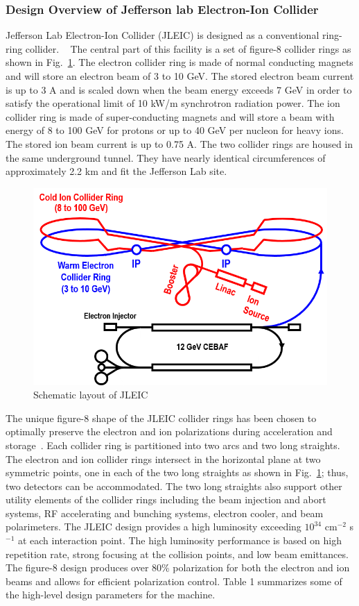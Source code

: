 \subsubsection{Design Overview of Jefferson lab Electron-Ion Collider}
Jefferson Lab Electron-Ion Collider (JLEIC) is designed as a conventional ring-ring collider.
~\cite{Abeyratne:2015pma} The central part of this facility is a set of figure-8 collider rings as shown in Fig.~\ref{fig:jleic1}. The electron collider ring is made of normal conducting magnets and will store an electron beam of 3 to 10 GeV. The stored electron beam current is up to 3 A and is scaled down when the beam energy exceeds 7 GeV in order to satisfy the operational limit of 10 kW/m synchrotron radiation power. The ion collider ring is made of super-conducting magnets and will store a beam with energy of 8 to 100 GeV for protons or up to 40 GeV per nucleon for heavy ions. The stored ion beam current is up to 0.75 A. The two collider rings are housed in the same underground tunnel. They have nearly identical circumferences of approximately 2.2 km and fit the Jefferson Lab site.

\begin{figure}[!htb]
	\centering
	\includegraphics[width=.65\textwidth]{../../img/jleic_schematic.png}
	\caption{Schematic layout of JLEIC}
	\label{fig:jleic1}
\end{figure}

The unique figure-8 shape of the JLEIC collider rings has been chosen to optimally preserve the electron and ion polarizations during acceleration and storage~\cite{Kondratenko:2016eqn}.  
Each collider ring is partitioned into two arcs and two long straights. The electron and ion collider rings intersect in the horizontal plane at two symmetric points, one in each of the two long straights as shown in Fig.~\ref{fig:jleic1}; thus, two detectors can be accommodated. The two long straights also support other utility elements of the collider rings including the beam injection and abort systems, RF accelerating and bunching systems, electron cooler, and beam polarimeters.
The JLEIC design provides a high luminosity exceeding $10^{34}$ cm$^{-2}$ s$^{-1}$ at each interaction point. The high luminosity performance is based on high repetition rate, strong focusing at the collision points, and low beam emittances. The figure-8 design produces over 80\% polarization for both the electron and ion beams and allows for efficient polarization control. Table 1 summarizes some of the high-level design parameters for the machine.

